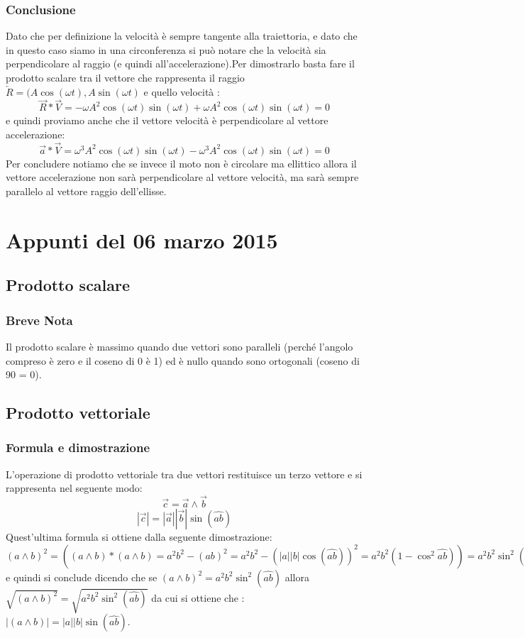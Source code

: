 \documentclass[paper = a4]{article}
\begin{document}
\subsubsection{Conclusione}
Dato che per definizione la velocità è sempre tangente alla traiettoria, e dato che in questo caso siamo in una circonferenza si può notare che la velocità sia perpendicolare al raggio (e quindi all'accelerazione).Per dimostrarlo basta fare il prodotto scalare tra il vettore che rappresenta il raggio $\overleftarrow{R} = (A\cos(\omega t),A\sin(\omega t)$ e quello velocità : 
$$\overrightarrow{R} * \overrightarrow{V} = -\omega A^2 \cos(\omega t) \sin(\omega t) +\omega A^2 \cos(\omega t) \sin(\omega t) = 0 $$
e quindi proviamo anche che il vettore velocità è perpendicolare al vettore accelerazione:
$$\overrightarrow{a} * \overrightarrow{V} = \omega^3A^2\cos(\omega t) \sin(\omega t) -\omega^3A^2\cos(\omega t) \sin(\omega t) = 0$$
Per concludere notiamo che se invece il moto non è circolare ma ellittico allora il vettore accelerazione non sarà perpendicolare al vettore velocità, ma sarà sempre parallelo al vettore raggio dell'ellisse.
\section{Appunti del 06 marzo 2015}
\subsection{Prodotto scalare}
\subsubsection{Breve Nota}
Il prodotto scalare è massimo quando due vettori sono paralleli (perché l'angolo compreso è zero e il coseno di 0 è 1) ed è nullo quando sono ortogonali (coseno di 90 = 0).
\subsection{Prodotto vettoriale}
\subsubsection{Formula e dimostrazione}
L'operazione di prodotto vettoriale tra due vettori restituisce un terzo vettore e si rappresenta nel seguente modo:
$$\overrightarrow{c} = \overrightarrow{a} \wedge \overrightarrow{b}$$
$$|\overrightarrow{c}|=|\overrightarrow{a}||\overrightarrow{b}|\sin(\widehat{ab})$$
Quest'ultima formula si ottiene dalla seguente dimostrazione:$(a \wedge b)^2 = ((a \wedge b)*(a \wedge b) = a^2b^2 - (ab)^2 = a^2b^2 -(|a||b|\cos(\widehat{ab}))^2 = a^2b^2(1-\cos^2\widehat{ab})) = a^2b^2 \sin^2(\widehat{ab})$ e quindi si conclude dicendo che se $(a \wedge b)^2 = a^2b^2 \sin^2(\widehat{ab}) $ allora $\sqrt{(a \wedge b)^2} = \sqrt{a^2b^2 \sin^2(\widehat{ab})} $ da cui si ottiene che : $|(a \wedge b)| = |a||b|\sin(\widehat{ab})$. 
\end{document}
